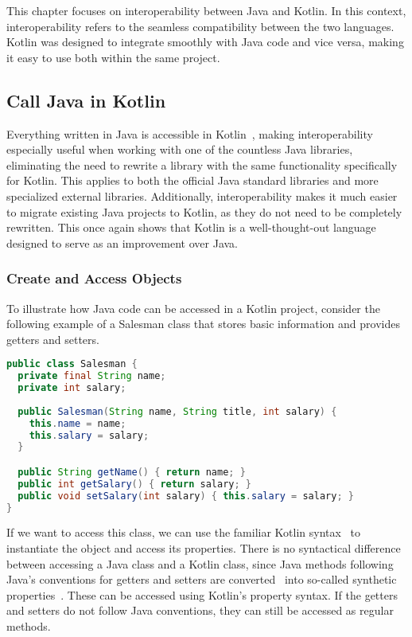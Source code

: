 \documentclass[a4paper,11pt]{article}
\begin{document}
This chapter focuses on interoperability between Java and Kotlin. In this context, interoperability refers to the seamless compatibility between the two languages. Kotlin was designed to integrate smoothly with Java code and vice versa, making it easy to use both within the same project.

\subsection{Call Java in Kotlin}
Everything written in Java is accessible in Kotlin~\cite{interop}, making interoperability especially useful when working with one of the countless Java libraries, eliminating the need to rewrite a library with the same functionality specifically for Kotlin. This applies to both the official Java standard libraries and more specialized external libraries. Additionally, interoperability makes it much easier to migrate existing Java projects to Kotlin, as they do not need to be completely rewritten. This once again shows that Kotlin is a well-thought-out language designed to serve as an improvement over Java.

\subsubsection{Create and Access Objects}
To illustrate how Java code can be accessed in a Kotlin project, consider the following example of a Salesman class that stores basic information and provides getters and setters.
\begin{lstlisting}[language=Java,title={Example Java class}]
public class Salesman {
  private final String name;
  private int salary;
  
  public Salesman(String name, String title, int salary) {
    this.name = name;
    this.salary = salary;
  }

  public String getName() { return name; }
  public int getSalary() { return salary; }
  public void setSalary(int salary) { this.salary = salary; }
}
\end{lstlisting}

If we want to access this class, we can use the familiar Kotlin syntax~\cite{interop} to instantiate the object and access its properties. There is no syntactical difference between accessing a Java class and a Kotlin class, since Java methods following Java's conventions for getters and setters are converted~\cite{interop-getter-setter} into so-called synthetic properties~\cite{interop-synthetic-property}. These can be accessed using Kotlin’s property syntax. If the getters and setters do not follow Java conventions, they can still be accessed as regular methods.
\end{document}
